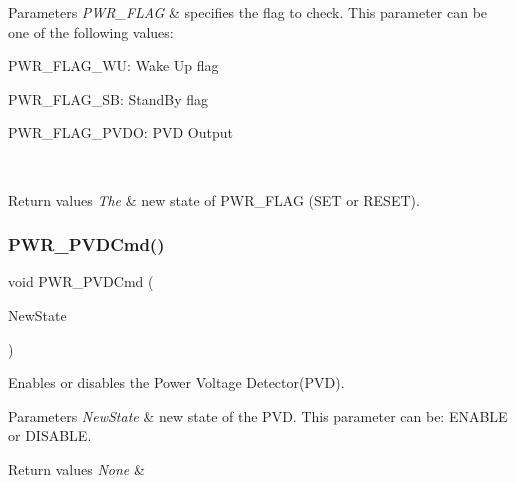\begin{DoxyParams}{Parameters}
{\em P\+W\+R\+\_\+\+F\+L\+AG} & specifies the flag to check. This parameter can be one of the following values\+: \begin{DoxyItemize}
\item P\+W\+R\+\_\+\+F\+L\+A\+G\+\_\+\+WU\+: Wake Up flag \item P\+W\+R\+\_\+\+F\+L\+A\+G\+\_\+\+SB\+: Stand\+By flag \item P\+W\+R\+\_\+\+F\+L\+A\+G\+\_\+\+P\+V\+DO\+: P\+VD Output \end{DoxyItemize}
\\
\hline
\end{DoxyParams}

\begin{DoxyRetVals}{Return values}
{\em The} & new state of P\+W\+R\+\_\+\+F\+L\+AG (S\+ET or R\+E\+S\+ET). \\
\hline
\end{DoxyRetVals}
\mbox{\label{group___p_w_r___exported___functions_ga42cad476b816e0a33594a933b3ed1acd}} 
\subsubsection{\texorpdfstring{PWR\_PVDCmd()}{PWR\_PVDCmd()}}
{\footnotesize\ttfamily void P\+W\+R\+\_\+\+P\+V\+D\+Cmd (\begin{DoxyParamCaption}\item[{\mbox{\hyperlink{group___exported__types_gac9a7e9a35d2513ec15c3b537aaa4fba1}{Functional\+State}}}]{New\+State }\end{DoxyParamCaption})}



Enables or disables the Power Voltage Detector(\+P\+V\+D). 


\begin{DoxyParams}{Parameters}
{\em New\+State} & new state of the P\+VD. This parameter can be\+: E\+N\+A\+B\+LE or D\+I\+S\+A\+B\+LE. \\
\hline
\end{DoxyParams}

\begin{DoxyRetVals}{Return values}
{\em None} & \\
\hline
\end{DoxyRetVals}
\mbox{\label{group___p_w_r___exported___functions_ga237c143ef6aa55abb8049fa7bf24ab8f}} 
